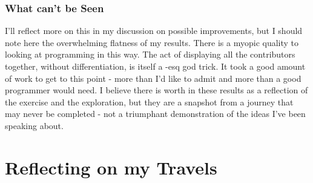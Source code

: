 \documentclass[a4paper,man,natbib,floatsintext]{apa6}
\begin{document}

  \subsubsection{What can't be Seen}
  I'll reflect more on this in my discussion on possible improvements, but I should note here the overwhelming flatness of my results. There is a myopic quality to looking at programming in this way. The act of displaying all the contributors together, without differentiation, is itself a \citet{Haraway1988-nh}-esq god trick. It took a good amount of work to get to this point - more than I'd like to admit and more than a good programmer would need. I believe there is worth in these results as a reflection of the exercise and the exploration, but they are a snapshot from a journey that may never be completed - not a triumphant demonstration of the ideas I've been speaking about.


   \section{Reflecting on my Travels}

\end{document}
